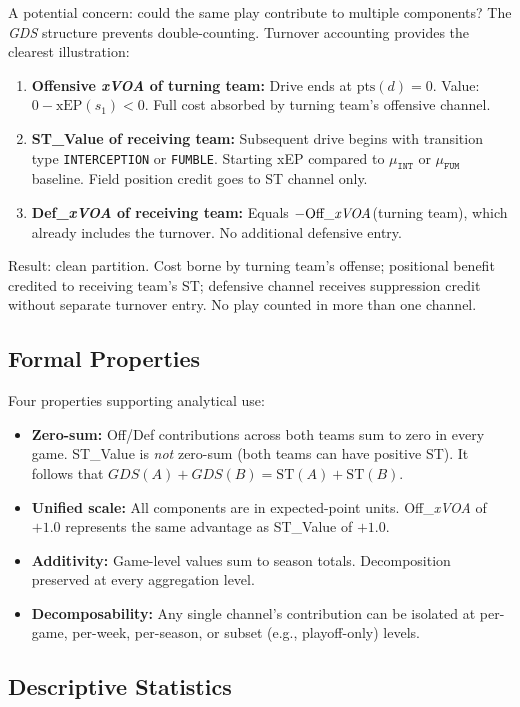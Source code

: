 \documentclass[12pt,a4paper]{article}
\newcommand{\xvoa}{\textit{xVOA}}
\newcommand{\gds}{\textit{GDS}}
\begin{document}
A potential concern: could the same play contribute to multiple components? The \gds{} structure prevents double-counting. Turnover accounting provides the clearest illustration:
\begin{enumerate}
  \item \textbf{Offensive \xvoa{} of turning team:} Drive ends at $\text{pts}(d) = 0$. Value: $0 - \text{xEP}(s_1) < 0$. Full cost absorbed by turning team's offensive channel.
  \item \textbf{ST\_Value of receiving team:} Subsequent drive begins with transition type \texttt{INTERCEPTION} or \texttt{FUMBLE}. Starting xEP compared to $\mu_{\texttt{INT}}$ or $\mu_{\texttt{FUM}}$ baseline. Field position credit goes to ST channel only.
  \item \textbf{Def\_\xvoa{} of receiving team:} Equals $-\text{Off\_\xvoa{}}$(turning team), which already includes the turnover. No additional defensive entry.
\end{enumerate}
Result: clean partition. Cost borne by turning team's offense; positional benefit credited to receiving team's ST; defensive channel receives suppression credit without separate turnover entry. No play counted in more than one channel.

\subsection{Formal Properties}

Four properties supporting analytical use:
\begin{itemize}
  \item \textbf{Zero-sum:} Off/Def contributions across both teams sum to zero in every game. ST\_Value is \emph{not} zero-sum (both teams can have positive ST). It follows that $\gds(A) + \gds(B) = \mathrm{ST}(A) + \mathrm{ST}(B)$.
  \item \textbf{Unified scale:} All components are in expected-point units. Off\_\xvoa{} of $+1.0$ represents the same advantage as ST\_Value of $+1.0$.
  \item \textbf{Additivity:} Game-level values sum to season totals. Decomposition preserved at every aggregation level.
  \item \textbf{Decomposability:} Any single channel's contribution can be isolated at per-game, per-week, per-season, or subset (e.g., playoff-only) levels.
\end{itemize}

\subsection{Descriptive Statistics}
\label{sec:descriptive-stats}
\end{document}
